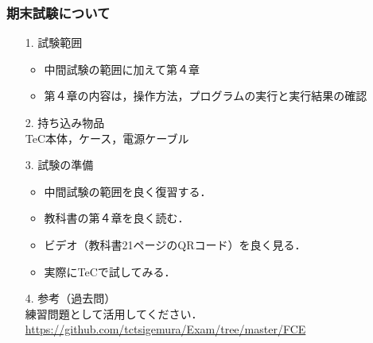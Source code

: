 \documentclass[handout]{beamer}         %
\begin{document}
\begin{frame}
  \frametitle{期末試験について}
  \begin{enumerate}
  \item[1.] 試験範囲
    \begin{itemize}
    \item 中間試験の範囲に加えて第４章
    \item 第４章の内容は，操作方法，プログラムの実行と実行結果の確認
    \end{itemize}
  \item[2.] 持ち込み物品\\
    TeC本体，ケース，電源ケーブル
  \item[3.] 試験の準備 \\
    \begin{itemize}
    \item 中間試験の範囲を良く復習する．
    \item 教科書の第４章を良く読む．
    \item ビデオ（教科書21ページのQRコード）を良く見る．
    \item 実際にTeCで試してみる．
    \end{itemize}
  \item[4.] 参考（過去問） \\
    練習問題として活用してください．\\
    \url{https://github.com/tctsigemura/Exam/tree/master/FCE}
  \end{enumerate}
  \vfill
\end{frame}

\end{document}
